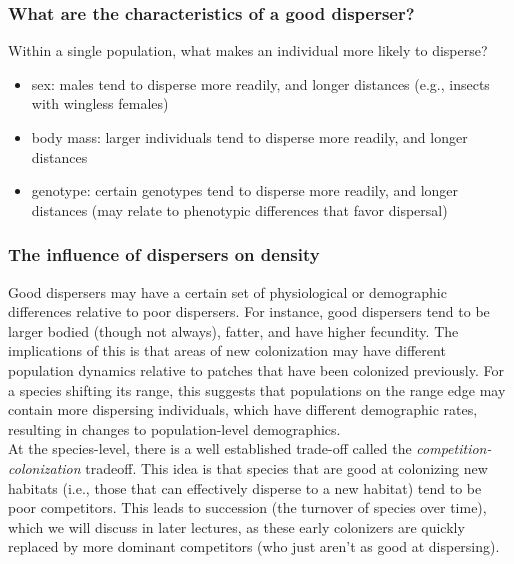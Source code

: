 \documentclass[12pt]{article}
\begin{document}
\subsubsection*{What are the characteristics of a good disperser?}

Within a single population, what makes an individual more likely to disperse? 

\begin{itemize}
  \item sex: males tend to disperse more readily, and longer distances (e.g., insects with wingless females)
  \item body mass: larger individuals tend to disperse more readily, and longer distances 
  \item genotype: certain genotypes tend to disperse more readily, and longer distances (may relate to phenotypic differences that favor dispersal)

\end{itemize}








\subsubsection*{The influence of dispersers on density}

Good dispersers may have a certain set of physiological or demographic differences relative to poor dispersers. For instance, good dispersers tend to be larger bodied (though not always), fatter, and have higher fecundity. The implications of this is that areas of new colonization may have different population dynamics relative to patches that have been colonized previously. For a species shifting its range, this suggests that populations on the range edge may contain more dispersing individuals, which have different demographic rates, resulting in changes to population-level demographics.\\

At the species-level, there is a well established trade-off called the \textit{competition-colonization} tradeoff. This idea is that species that are good at colonizing new habitats (i.e., those that can effectively disperse to a new habitat) tend to be poor competitors. This leads to succession (the turnover of species over time), which we will discuss in later lectures, as these early colonizers are quickly replaced by more dominant competitors (who just aren't as good at dispersing). 
\end{document}
